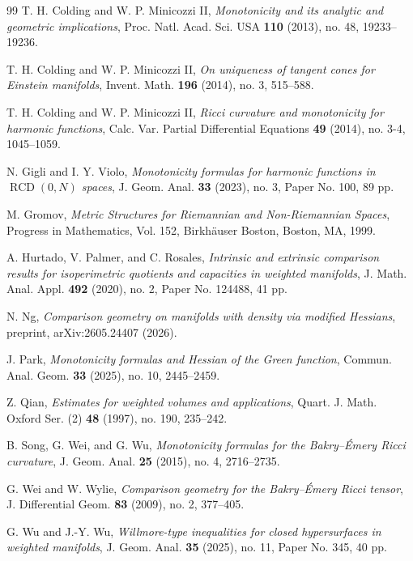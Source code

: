 \documentclass[11pt]{article}
\begin{document}
\begin{thebibliography}{99}
 T. H. Colding and W. P. Minicozzi II, {\em Monotonicity and its analytic and geometric implications}, Proc. Natl. Acad. Sci. USA {\bf 110} (2013), no. 48, 19233--19236.

 T. H. Colding and W. P. Minicozzi II, {\em On uniqueness of tangent cones for Einstein manifolds}, Invent. Math. {\bf 196} (2014), no. 3, 515--588.

 T. H. Colding and W. P. Minicozzi II, {\em Ricci curvature and monotonicity for harmonic functions}, Calc. Var. Partial Differential Equations {\bf 49} (2014), no. 3-4, 1045--1059.

 N. Gigli and I. Y. Violo, {\em Monotonicity formulas for harmonic functions in $\operatorname{RCD}(0,N)$ spaces}, J. Geom. Anal. {\bf 33} (2023), no. 3, Paper No. 100, 89 pp.

 M. Gromov, {\em Metric Structures for Riemannian and Non-Riemannian Spaces}, Progress in Mathematics, Vol. 152, Birkh\"auser Boston, Boston, MA, 1999.

 A. Hurtado, V. Palmer, and C. Rosales, {\em Intrinsic and extrinsic comparison results for isoperimetric quotients and capacities in weighted manifolds}, J. Math. Anal. Appl. {\bf 492} (2020), no. 2, Paper No. 124488, 41 pp.

 N. Ng, {\em Comparison geometry on manifolds with density via modified Hessians}, preprint, arXiv:2605.24407 (2026).

 J. Park, {\em Monotonicity formulas and Hessian of the Green function}, Commun. Anal. Geom. {\bf 33} (2025), no. 10, 2445--2459.

 Z. Qian, {\em Estimates for weighted volumes and applications}, Quart. J. Math. Oxford Ser. (2) {\bf 48} (1997), no. 190, 235--242.

 B. Song, G. Wei, and G. Wu, {\em Monotonicity formulas for the Bakry--\'Emery Ricci curvature}, J. Geom. Anal. {\bf 25} (2015), no. 4, 2716--2735.

 G. Wei and W. Wylie, {\em Comparison geometry for the Bakry--\'Emery Ricci tensor}, J. Differential Geom. {\bf 83} (2009), no. 2, 377--405.

 G. Wu and J.-Y. Wu, {\em Willmore-type inequalities for closed hypersurfaces in weighted manifolds}, J. Geom. Anal. {\bf 35} (2025), no. 11, Paper No. 345, 40 pp.

\end{thebibliography}
\end{document}
